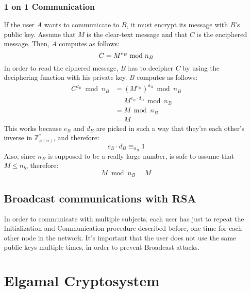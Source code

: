 \subsubsection{1 on 1 Communication}
If the user $A$ wants to communicate to $B$, it must encrypt its message with $B$'s public key. Assume that $M$ is the clear-text message and that $C$ is the enciphered message. Then, $A$ computes as follows:
\[
    C = M^{e_{B}} \bmod n_{B} \\
\]
In order to read the ciphered message, $B$ has to decipher $C$ by using the deciphering function with his private key. $B$ computes as follows:
\begin{align*}
    C^{d_{B}} \bmod n_{B} &= (M^{e_{B}})^{d_{B}} \bmod n_{B} \\
    &= M^{e_{B} \cdot d_{B}} \bmod n_{B} \\
    &= M \bmod n_{B} \\
    &= M
\end{align*}
This works because $e_{B}$ and $d_{B}$ are picked in such a way that they're each other's inverse in $\mathbb{Z}_{\varphi(n)}^{*}$, and therefore:
\[
    e_{B} \cdot d_{B} \equiv_{n_{B}} 1
\]
Also, since $n_{B}$ is supposed to be a really large number, is safe to assume that $M \leq n_{b}$, therefore:
\[
M \bmod n_{B} = M
\]

\subsection{Broadcast communications with RSA}
In order to communicate with multiple subjects, each user has just to repeat the Initialization and Communication procedure described before, one time for each other node in the network. \newline
It's important that the user does not use the same public keys multiple times, in order to prevent Broadcast attacks.

\section{Elgamal Cryptosystem}
